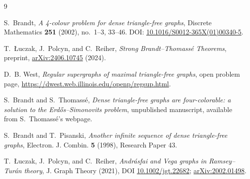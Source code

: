 \documentclass[11pt]{article}
\theoremstyle{definition}
\theoremstyle{remark}
\begin{document}
\begin{thebibliography}{9}

S.~Brandt,
\emph{A 4-colour problem for dense triangle-free graphs},
Discrete Mathematics \textbf{251} (2002), no.~1--3, 33--46.
DOI: \href{https://doi.org/10.1016/S0012-365X(01)00340-5}{10.1016/S0012-365X(01)00340-5}.

T.~\L{}uczak, J.~Polcyn, and C.~Reiher,
\emph{Strong Brandt--Thomass\'e Theorems},
preprint, \href{https://arxiv.org/abs/2406.10745}{arXiv:2406.10745} (2024).

D.~B. West,
\emph{Regular supergraphs of maximal triangle-free graphs},
open problem page,
\url{https://dwest.web.illinois.edu/openp/regsup.html}.

S.~Brandt and S.~Thomass\'e,
\emph{Dense triangle-free graphs are four-colorable: a solution to the
Erd\H{o}s--Simonovits problem}, unpublished manuscript, available from
S.~Thomass\'e's webpage.

S.~Brandt and T.~Pisanski,
\emph{Another infinite sequence of dense triangle-free graphs},
Electron. J. Combin. \textbf{5} (1998), Research Paper 43.

T.~\L{}uczak, J.~Polcyn, and C.~Reiher,
\emph{Andr\'asfai and Vega graphs in Ramsey--Tur\'an theory},
J. Graph Theory (2021), DOI \href{https://doi.org/10.1002/jgt.22682}{10.1002/jgt.22682};
\href{https://arxiv.org/abs/2002.01498}{arXiv:2002.01498}.

\end{thebibliography}
\end{document}
